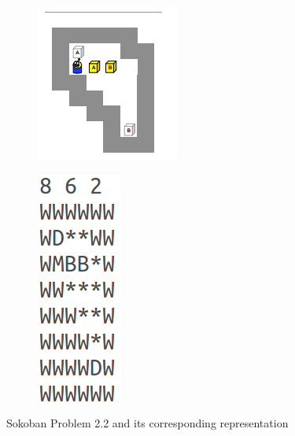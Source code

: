 \documentclass[10pt, letter]{article}
\begin{document}
\begin{figure} [h!]
\centering
\begin{subfigure}{.5\textwidth}
  \centering
  \includegraphics[scale = 0.5]{images/sokoban2}
\end{subfigure}%
\begin{subfigure}{.5\textwidth}
  \centering
  \includegraphics[scale = 0.5]{images/sokoban2-plan}
\end{subfigure}%
\caption{Sokoban Problem 2.2 and its corresponding representation}
\label{soko2}
\end{figure}
\end{document}
